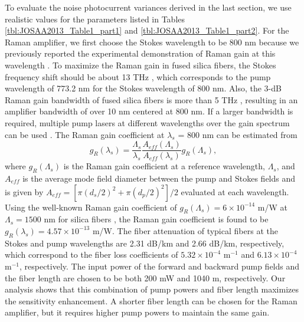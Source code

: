 To evaluate the noise photocurrent variances derived in the last section, we use realistic values for the parameters listed in Tables \ref{tbl:JOSAA2013_Table1_part1} and \ref{tbl:JOSAA2013_Table1_part2}. For the Raman amplifier, we first choose the Stokes wavelength to be 800 nm because we previously reported the experimental demonstration of Raman gain at this wavelength \cite{goda2009demonstration, mahjoubfar2010raman}. To maximize the Raman gain in fused silica fibers, the Stokes frequency shift should be about 13 THz \cite{islam2002raman}, which corresponds to the pump wavelength of 773.2 nm for the Stokes wavelength of 800 nm. Also, the 3-dB Raman gain bandwidth of fused silica fibers is more than 5 THz \cite{islam2002raman}, resulting in an amplifier bandwidth of over 10 nm centered at 800 nm. If a larger bandwidth is required, multiple pump lasers at different wavelengths over the gain spectrum can be used \cite{islam2002raman}. The Raman gain coefficient at $\lambda_s$ = 800 nm can be estimated from \cite{rottwitt2003scaling}
\begin{equation}
g_R(\lambda_s)=\frac{\Lambda_s}{\lambda_s}\frac{A_{eff}(\Lambda_s)}{A_{eff}(\lambda_s)}g_R(\Lambda_s),\label{eqn:JOSAA_Equation_21}
\end{equation}
where $g_R(\Lambda_s)$ is the Raman gain coefficient at a reference wavelength, $\Lambda_s$, and $A_{eff}$ is the average mode field diameter between the pump and Stokes fields and is given by $A_{eff}=[\pi(d_s/2)^2+\pi(d_p/2)^2]/2$ evaluated at each wavelength. Using the well-known Raman gain coefficient of $g_R(\Lambda_s)= 6 \times 10^{-14}$ m/W at $\Lambda_s = 1500$ nm for silica fibers \cite{islam2002raman}, the Raman gain coefficient is found to be $g_R(\lambda_s) =  4.57 \times 10^{-13}$ m/W.
The fiber attenuation of typical fibers at the Stokes and pump wavelengths are 2.31 dB/km and 2.66 dB/km, respectively, which correspond to the fiber loss coefficients of $5.32 \times 10^{-4}$ m$^{-1}$ and $6.13 \times 10^{-4}$ m$^{-1}$, respectively. The input power of the forward and backward pump fields and the fiber length are chosen to be both 200 mW and 1040 m, respectively. Our analysis shows that this combination of pump powers and fiber length maximizes the sensitivity enhancement. A shorter fiber length can be chosen for the Raman amplifier, but it requires higher pump powers to maintain the same gain.

